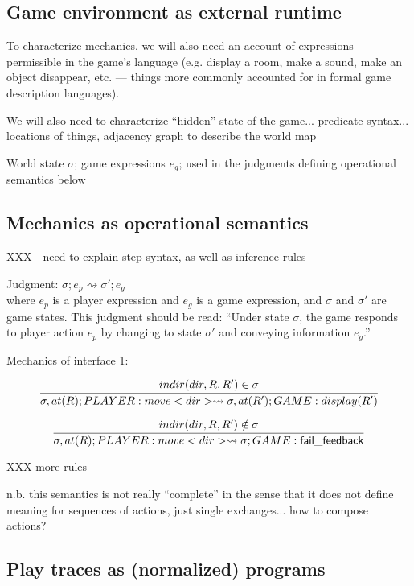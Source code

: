 \documentclass[sigconf]{acmart}
\begin{document}
  \subsection{Game environment as external runtime}

  To characterize mechanics, we will also need an account of expressions
  permissible in the game's language (e.g. display a room, make a sound,
  make an object disappear, etc. --- things more commonly accounted for in
  formal game description languages). 

  We will also need to characterize ``hidden'' state of the game...
  predicate syntax... locations of things, adjacency graph to describe the
  world map

  World state $\sigma$; game expressions $e_g$; used in the judgments
  defining operational semantics below


  \subsection{Mechanics as operational semantics}

  XXX - need to explain step syntax, as well as inference rules

  \newcommand{\stepsto}{\rightsquigarrow}

  Judgment: $\sigma; e_p \stepsto \sigma'; e_g$ \\
  where $e_p$ is a player expression and $e_g$ is a game expression, and
  $\sigma$ and $\sigma'$ are game states. This judgment should be read:
  ``Under state $\sigma$, the game responds to player action $e_p$ by
  changing to state $\sigma'$ and conveying information $e_g$.''

  Mechanics of interface 1:

  \[
    \infer{
      \sigma, at(R); PLAYER: move<dir> \stepsto \sigma, at(R'); GAME:
      display(R')
    }
    {
      indir(dir, R, R') \in \sigma
    }
  \]


  \[
    \infer{
      \sigma, at(R); PLAYER: move<dir> \stepsto 
      \sigma; GAME: \mathsf{fail\_feedback}
    }
    {
      indir(dir, R, R') \notin \sigma
    }
  \]

  XXX more rules

  n.b. this semantics is not really ``complete'' in the sense that it does
  not define meaning for sequences of actions, just single exchanges... how
  to compose actions?

  \subsection{Play traces as (normalized) programs}
  
\end{document}
